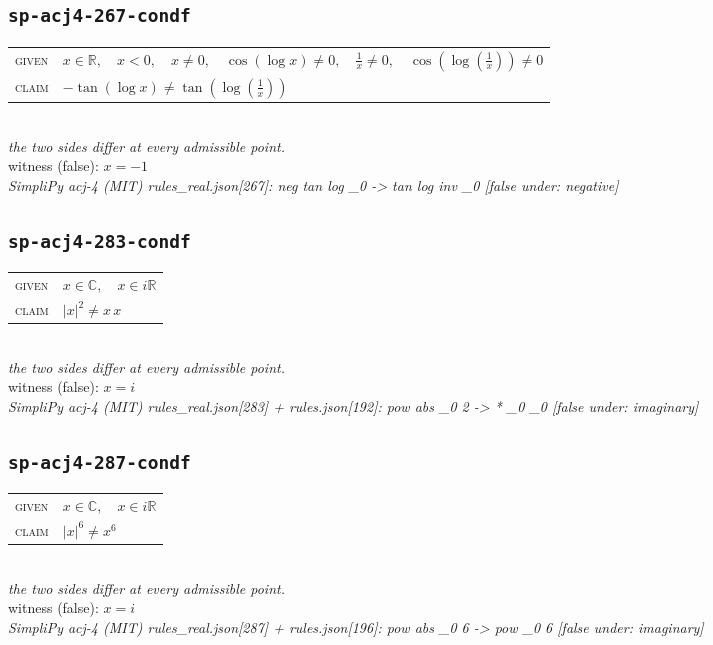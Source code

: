 \documentclass[11pt]{article}
\begin{document}
\subsection*{\texttt{sp-acj4-267-condf}}
\begin{tabular}{@{}l@{\quad}l@{}}
\textsc{given} & $x \in \mathbb{R},\quad x < 0,\quad x \neq 0,\quad \cos\left(\log x\right) \neq 0,\quad \frac{1}{x} \neq 0,\quad \cos\left(\log\left(\frac{1}{x}\right)\right) \neq 0$ \\[4pt]
\textsc{claim} & $\displaystyle -\tan\left(\log x\right) \neq \tan\left(\log\left(\frac{1}{x}\right)\right)$ \\
\end{tabular}\\[2pt]
{\small\emph{the two sides differ at every admissible point.}}\\
{\footnotesize\color{gray}witness (false): $x = -1$}\\
\emph{SimpliPy acj-4 (MIT) rules\_real.json[267]: neg tan log \_0  ->  tan log inv \_0  [false under: negative]}\\

\subsection*{\texttt{sp-acj4-283-condf}}
\begin{tabular}{@{}l@{\quad}l@{}}
\textsc{given} & $x \in \mathbb{C},\quad x \in i\mathbb{R}$ \\[4pt]
\textsc{claim} & $\displaystyle \left|x\right|^{2} \neq x \, x$ \\
\end{tabular}\\[2pt]
{\small\emph{the two sides differ at every admissible point.}}\\
{\footnotesize\color{gray}witness (false): $x = i$}\\
\emph{SimpliPy acj-4 (MIT) rules\_real.json[283] + rules.json[192]: pow abs \_0 2  ->  * \_0 \_0  [false under: imaginary]}\\

\subsection*{\texttt{sp-acj4-287-condf}}
\begin{tabular}{@{}l@{\quad}l@{}}
\textsc{given} & $x \in \mathbb{C},\quad x \in i\mathbb{R}$ \\[4pt]
\textsc{claim} & $\displaystyle \left|x\right|^{6} \neq x^{6}$ \\
\end{tabular}\\[2pt]
{\small\emph{the two sides differ at every admissible point.}}\\
{\footnotesize\color{gray}witness (false): $x = i$}\\
\emph{SimpliPy acj-4 (MIT) rules\_real.json[287] + rules.json[196]: pow abs \_0 6  ->  pow \_0 6  [false under: imaginary]}\\
\end{document}
